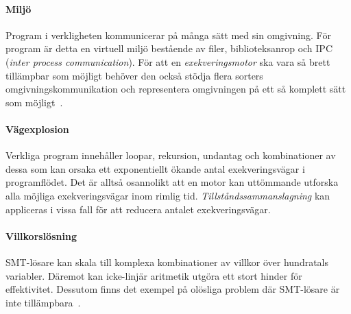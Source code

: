 \paragraph{Miljö} Program i verkligheten kommunicerar på många sätt med sin
omgivning. För program är detta en virtuell miljö bestående av filer,
biblioteksanrop och IPC (\emph{inter process communication}). För att en
\textit{exekveringsmotor} ska vara så brett tillämpbar som möjligt behöver den
också stödja flera sorters omgivningskommunikation och representera omgivningen
på ett så komplett sätt som möjligt~\cite{survey_symb_exc}.

\paragraph{Vägexplosion} Verkliga program innehåller loopar, rekursion,
undantag och kombinationer av dessa som kan orsaka ett exponentiellt ökande
antal exekveringsvägar i programflödet. Det är alltså osannolikt att en motor
kan uttömmande utforska alla möjliga exekveringsvägar inom rimlig tid.
\emph{Tillståndssammanslagning} kan appliceras i vissa fall för att reducera antalet
exekveringsvägar.

\paragraph{Villkorslösning} SMT-lösare kan skala till komplexa kombinationer av
villkor över hundratals variabler. Däremot kan icke-linjär aritmetik utgöra ett
stort hinder för effektivitet. Dessutom finns det exempel på olösliga problem
där SMT-lösare är inte tillämpbara~\cite{survey_symb_exc}.

